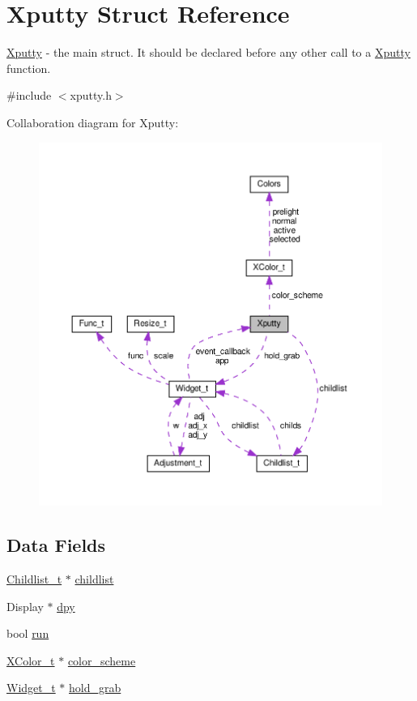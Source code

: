 \hypertarget{structXputty}{}\section{Xputty Struct Reference}
\label{structXputty}


\hyperlink{structXputty}{Xputty} -\/ the main struct. It should be declared before any other call to a \hyperlink{structXputty}{Xputty} function.  




{\ttfamily \#include $<$xputty.\+h$>$}



Collaboration diagram for Xputty\+:
\nopagebreak
\begin{figure}[H]
\begin{center}
\leavevmode
\includegraphics[width=350pt]{structXputty__coll__graph}
\end{center}
\end{figure}
\subsection*{Data Fields}
\begin{DoxyCompactItemize}
\item 
\hyperlink{structChildlist__t}{Childlist\+\_\+t} $\ast$ \hyperlink{structXputty_a55fafc08d9702ab14137f52f35c4ff19}{childlist}
\item 
Display $\ast$ \hyperlink{structXputty_ab185ae4fd00ee1930c61e0440734878f}{dpy}
\item 
bool \hyperlink{structXputty_a3a8e0381e77ae9fae69aab5dda8e7e7a}{run}
\item 
\hyperlink{structXColor__t}{X\+Color\+\_\+t} $\ast$ \hyperlink{structXputty_aab9298d9341e315b1aa4ac16188c699e}{color\+\_\+scheme}
\item 
\hyperlink{structWidget__t}{Widget\+\_\+t} $\ast$ \hyperlink{structXputty_a744a6ffdff59d8725c863e7ecddfc0e1}{hold\+\_\+grab}
\end{DoxyCompactItemize}


